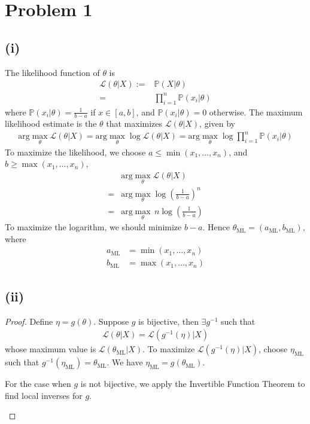 \documentclass[twoside,11pt]{homework}
\date{02/21/2020}
\begin{document}
\maketitle

\section*{Problem 1} 
\subsection*{(i)}
	The likelihood function of $\theta$ is 
	\begin{align*}
		\mathcal{L}(\theta|X):=& \mathbb{P}(X|\theta) \\
		=& \prod_{i=1}^n \mathbb{P}(x_i | \theta) \tag{i.i.d.}
	\end{align*}
	where $\mathbb{P}(x_i | \theta) = \frac{1}{b-a}$ if $x\in [a,b]$, and $\mathbb{P}(x_i | \theta) = 0$ otherwise. 
	The maximum likelihood estimate is the $\theta$ that maximizes $\mathcal{L}(\theta|X)$, given by
	\begin{align*}
		 \text{arg}\max_\theta \mathcal{L}(\theta|X) 
		=  \text{arg}\max_\theta \log \mathcal{L}(\theta|X) 
		= \text{arg}\max_\theta \log \prod_{i=1}^n \mathbb{P}(x_i | \theta)
	\end{align*}
	To maximize the likelihood, we choose $a\leq \min(x_1,\dots,x_n)$, and  $b\geq \max(x_1,\dots,x_n)$,
	\begin{align*}
		& \text{arg}\max_\theta \mathcal{L}(\theta|X) \\
		= & \text{arg}\max_\theta \log \left(\frac{1}{b-a}\right)^n \\
		= & \text{arg} \max_\theta \, n \log\left(\frac{1}{b-a}\right)
	\end{align*}
	To maximize the logarithm, we should minimize $b-a$. Hence $\theta_{\text{ML}} = (a_{\text{ML}} ,b_{\text{ML}} )$, where
	\begin{align*}
		a_{\text{ML}}  &= \min(x_1,\dots,x_n) \\
		b_{\text{ML}}  &= \max(x_1,\dots,x_n)
	\end{align*}
\subsection*{(ii)}
	\begin{proof}
		Define $\eta = g(\theta)$. Suppose $g$ is bijective, then $\exists g^{-1}$ such that 
		\begin{align*}
			\mathcal{L}(\theta|X) = \mathcal{L}( g^{-1}(\eta) |X)
		\end{align*}
		whose maximum value is $\mathcal{L}(\theta_{\text{ML}}|X) $. 
		To maximize $\mathcal{L}( g^{-1}(\eta) |X)$, choose $\eta_{\text{ML}}$
		such that $g^{-1}(\eta_{\text{ML}})=\theta_{\text{ML}}$. We have $\eta_{\text{ML}}=g(\theta_{\text{ML}})$.\\
		\begin{remark} 
			For the case when $g$ is not bijective, we apply the Invertible Function Theorem to find local inverses for $g$.		
		\end{remark}
	\end{proof}
\end{document}
